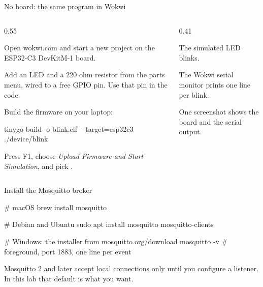 \documentclass[10pt,aspectratio=169,t]{beamer}
\begin{document}
\begin{frame}[fragile,embedded,eyebrow=Task III]{No board: the same program in Wokwi}
  \begin{columns}[T]
    \begin{column}{0.55\textwidth}
      \begin{steps}
        \item Open wokwi.com and start a new project on the ESP32-C3 DevKitM-1 board.
        \item Add an LED and a 220 ohm resistor from the parts menu, wired to a free GPIO pin. Use that pin in the code.
        \item Build the firmware on your laptop:
\begin{shell}
tinygo build -o blink.elf \
  -target=esp32c3 ./device/blink
\end{shell}
        \item Press F1, choose \emph{Upload Firmware and Start Simulation}, and pick .
      \end{steps}
    \end{column}
    \begin{column}{0.41\textwidth}
      \begin{checklist}
        \item The simulated LED blinks.
        \item The Wokwi serial monitor prints one line per blink.
        \item One screenshot shows the board and the serial output.
      \end{checklist}
    \end{column}
  \end{columns}
\end{frame}

\begin{frame}[fragile,eyebrow=Setup]{Install the Mosquitto broker}
\begin{shell}
# macOS
brew install mosquitto

# Debian and Ubuntu
sudo apt install mosquitto mosquitto-clients

# Windows: the installer from mosquitto.org/download
mosquitto -v         # foreground, port 1883, one line per event
\end{shell}
  \begin{hint}
    Mosquitto 2 and later accept local connections only until you configure a listener. In this lab that default is what you want.
  \end{hint}
\end{frame}
\end{document}
